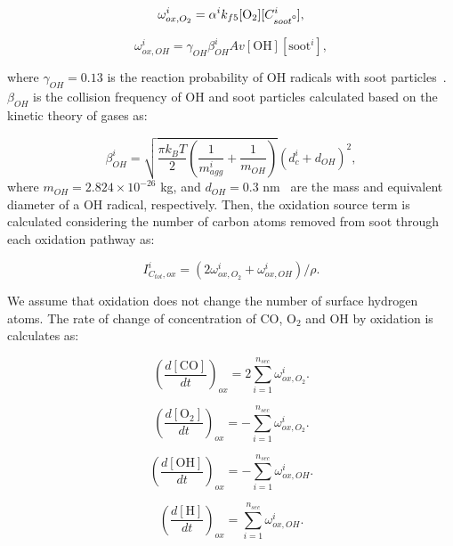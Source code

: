 \begin{equation}
	\omega^i_{ox,O_2} = \alpha^i k_{f5} [\mathrm{O_2}][C^i_{soot\mbox{\textdegree}}],
	\label{eqn:hacaO2Rate}
\end{equation}

\begin{equation}
	\omega^i_{ox,OH} = \gamma_{OH} \beta^i_{OH} Av [\mathrm{OH}][\mathrm{soot}^i],
	\label{eqn:hacaOHRate}
\end{equation}

\noindent where $\gamma_{OH}=0.13$ is the reaction probability of OH radicals with soot particles~\citep{appel2000kinetic}. $\beta_{OH}$ is the collision frequency of OH and soot particles calculated based on the kinetic theory of gases as:

\begin{equation}
	\beta^i_{OH} = 
	\sqrt{
		\frac{\pi k_B T}{2}\left(\frac{1}{m^i_{agg}}+\frac{1}{m_{OH}}\right)
	}
	\left(d^i_c+d_{OH}\right)^2,
	\label{eqn:betaOH}
\end{equation}
\noindent where $m_{OH}=2.824\times10^{-26}$ kg, and $d_{OH}=0.3$ nm~\citep{shepherd2022measurement} are the mass and equivalent diameter of a OH radical, respectively. Then, the oxidation source term is calculated considering the number of carbon atoms removed from soot through each oxidation pathway as:

\begin{equation}
	I^i_{C_{tot},ox} = (2\omega^i_{ox,O_2} + \omega^i_{ox,OH})/\rho
	\label{eqn:ICtot}.
\end{equation}

We assume that oxidation does not change the number of surface hydrogen atoms. The rate of change of concentration of CO, $\mathrm{O_2}$ and OH by oxidation is calculates as:

\begin{equation}
	\left(\frac{d\left[{\mathrm{CO}}\right]}{dt}\right)_{ox} = 2\sum_{i=1}^{n_{sec}}\omega^i_{ox,O_2}
	\label{eqn:COrate_ox}.
\end{equation}

\begin{equation}
	\left(\frac{d\left[{\mathrm{O_2}}\right]}{dt}\right)_{ox} = -\sum_{i=1}^{n_{sec}}\omega^i_{ox,O_2}
	\label{eqn:O2rate_ox}.
\end{equation}

\begin{equation}
	\left(\frac{d\left[{\mathrm{OH}}\right]}{dt}\right)_{ox} = -\sum_{i=1}^{n_{sec}}\omega^i_{ox,OH}
	\label{eqn:Hrate_ox}.
\end{equation}

\begin{equation}
	\left(\frac{d\left[{\mathrm{H}}\right]}{dt}\right)_{ox} = \sum_{i=1}^{n_{sec}}\omega^i_{ox,OH}
	\label{eqn:OHrate_ox}.
\end{equation}



